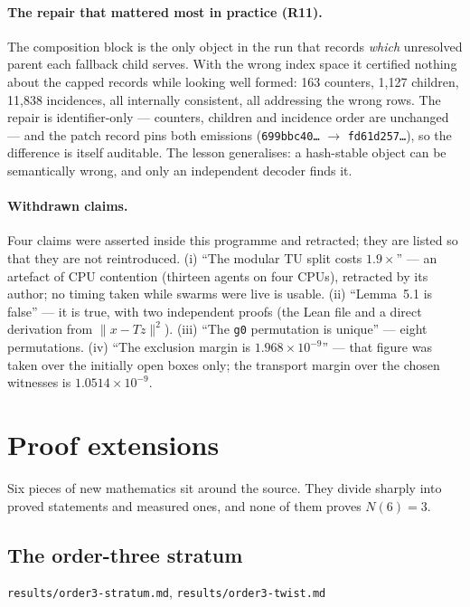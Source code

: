 \documentclass[10pt]{article}
\theoremstyle{definition}
\newcommand{\norm}[1]{\lVert #1\rVert}
\newcommand{\file}[1]{\texttt{\small #1}}
\begin{document}
\paragraph{The repair that mattered most in practice (R11).} The composition block is the only object
in the run that records \emph{which} unresolved parent each fallback child serves. With the wrong index
space it certified nothing about the capped records while looking well formed: 163 counters, 1,127
children, 11,838 incidences, all internally consistent, all addressing the wrong rows. The repair is
identifier-only --- counters, children and incidence order are unchanged --- and the patch record pins
both emissions (\texttt{699bbc40\ldots} $\to$ \texttt{fd61d257\ldots}), so the difference is itself
auditable. The lesson generalises: a hash-stable object can be semantically wrong, and only an
independent decoder finds it.

\paragraph{Withdrawn claims.} Four claims were asserted inside this programme and retracted; they are
listed so that they are not reintroduced. (i) ``The modular TU split costs $1.9\times$'' --- an artefact
of CPU contention (thirteen agents on four CPUs), retracted by its author; no timing taken while
swarms were live is usable. (ii) ``Lemma~5.1 is false'' --- it is true, with two independent proofs
(the Lean file and a direct derivation from $\norm{x-Tz}^2$). (iii) ``The \texttt{g0} permutation is
unique'' --- eight permutations. (iv) ``The exclusion margin is $1.968\times10^{-9}$'' --- that figure
was taken over the initially open boxes only; the transport margin over the chosen witnesses is
$1.0514\times10^{-9}$.

\section{Proof extensions}\label{sec:ext}

Six pieces of new mathematics sit around the source. They divide sharply into proved statements and
measured ones, and none of them proves $N(6)=3$.

\subsection{The order-three stratum}\label{sec:order3}
\file{results/\allowbreak{}order3-\allowbreak{}stratum.md}, \file{results/\allowbreak{}order3-\allowbreak{}twist.md}
\end{document}
